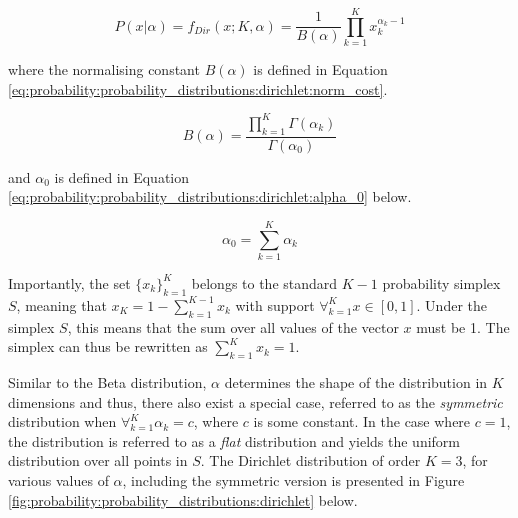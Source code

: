 \begin{equation}
    \label{eq:probability:probability_distributions:dirichlet:pdf}
    P(x \vert \alpha) =  f_{Dir}(x; K, \alpha) = \frac{1}{B(\alpha)}  \prod_{k=1}^{K} x_{k}^{\alpha_{k} - 1}
\end{equation}

where the normalising constant $B(\alpha)$ is defined in Equation \ref{eq:probability:probability_distributions:dirichlet:norm_cost}.

\begin{equation}
    \label{eq:probability:probability_distributions:dirichlet:norm_cost}
    B(\alpha) = \frac{\prod_{k=1}^{K} \Gamma(\alpha_{k})}{\Gamma(\alpha_{0})}
\end{equation}

and $\alpha_{0}$ is defined in Equation \ref{eq:probability:probability_distributions:dirichlet:alpha_0} below.

\begin{equation}
    \label{eq:probability:probability_distributions:dirichlet:alpha_0}
    \alpha_{0} = \sum_{k=1}^{K}\alpha_{k}
\end{equation}

Importantly, the set $\{x_{k}\}_{k=1}^{K}$ belongs to the standard $K-1$ probability simplex $S$, meaning that $x_{K} = 1 - \sum_{k=1}^{K-1}x_{k}$ with support $\forall_{k=1}^{K} x \in [0,1]$. Under the simplex $S$, this means that the sum over all values of the vector $x$ must be 1. The simplex can thus be rewritten as $\sum_{k=1}^{K}x_{k} = 1$.

Similar to the Beta distribution, $\alpha$ determines the shape of the distribution in $K$ dimensions and thus, there also exist a special case, referred to as the \textit{symmetric} distribution when $\forall_{k=1}^{K} \alpha_{k} = c$, where $c$ is some constant. In the case where $c = 1$, the distribution is referred to as a \textit{flat} distribution and yields the uniform distribution over all points in $S$. The Dirichlet distribution of order $K = 3$, for various values of $\alpha$, including the symmetric version is presented in Figure \ref{fig:probability:probability_distributions:dirichlet} below.

